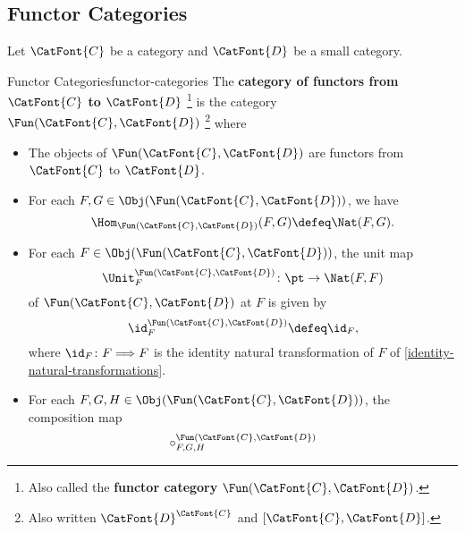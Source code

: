 \subsection{Functor Categories}\label{subsection-functor-categories}
Let $\CatFont{C}$ be a category and $\CatFont{D}$ be a small category.
\begin{definition}{Functor Categories}{functor-categories}%
    The \textbf{category of functors from $\CatFont{C}$ to $\CatFont{D}$}%
    \footnote{%
        Also called the \textbf{functor category} $\Fun(\CatFont{C},\CatFont{D})$.
    } %
    is the category $\Fun(\CatFont{C},\CatFont{D})$%
    \footnote{%
        Also written $\CatFont{D}^{\CatFont{C}}$ and $[\CatFont{C},\CatFont{D}]$.
        \par\vspace*{\TCBBoxCorrection}
    } %
    where
    \begin{itemize}
        \item{}The objects of $\Fun(\CatFont{C},\CatFont{D})$ are functors from $\CatFont{C}$ to $\CatFont{D}$.
        \item{}For each $F,G\in\Obj(\Fun(\CatFont{C},\CatFont{D}))$, we have
            \[
                \Hom_{\Fun(\CatFont{C},\CatFont{D})}(F,G)
                \defeq
                \Nat(F,G).
            \]%
        \item{}For each $F\in\Obj(\Fun(\CatFont{C},\CatFont{D}))$, the unit map
            \[
                \Unit^{\Fun(\CatFont{C},\CatFont{D})}_{F}
                \colon
                \pt
                \to
                \Nat(F,F)
            \]%
            of $\Fun(\CatFont{C},\CatFont{D})$ at $F$ is given by
            \[
                \id^{\Fun(\CatFont{C},\CatFont{D})}_{F}
                \defeq
                \id_{F},
            \]%
            where $\id_{F}\colon F\Longrightarrow F$ is the identity natural transformation of $F$ of \cref{identity-natural-transformations}.
        \item{}For each $F,G,H\in\Obj(\Fun(\CatFont{C},\CatFont{D}))$, the composition map
            \[
                \circ^{\Fun(\CatFont{C},\CatFont{D})}_{F,G,H}
\]
\end{itemize}
\end{definition}
